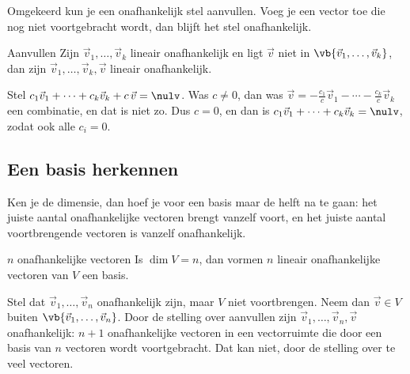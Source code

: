 \begin{oefeningen}
\end{oefeningen}

Omgekeerd kun je een onafhankelijk stel aanvullen. Voeg je een vector toe die nog niet voortgebracht wordt, dan blijft het stel onafhankelijk.

\begin{theorie}
\begin{stelling}{Aanvullen}
Zijn $\vec v_1, \ldots, \vec v_k$ lineair onafhankelijk en ligt $\vec v$ niet in $\vb{\vec v_1, \ldots, \vec v_k}$, dan zijn $\vec v_1, \ldots, \vec v_k, \vec v$ lineair onafhankelijk.
\end{stelling}

\begin{bewijs}
Stel $c_1\vec v_1 + \cdots + c_k\vec v_k + c\,\vec v = \nulv$. Was $c \neq 0$, dan was $\vec v = -\frac{c_1}{c}\vec v_1 - \cdots - \frac{c_k}{c}\vec v_k$ een combinatie, en dat is niet zo. Dus $c = 0$, en dan is $c_1\vec v_1 + \cdots + c_k\vec v_k = \nulv$, zodat ook alle $c_i = 0$.
\end{bewijs}
\end{theorie}

\subsection{Een basis herkennen}

Ken je de dimensie, dan hoef je voor een basis maar de helft na te gaan: het juiste aantal onafhankelijke vectoren brengt vanzelf voort, en het juiste aantal voortbrengende vectoren is vanzelf onafhankelijk.

\begin{theorie}
\begin{stelling}{$n$ onafhankelijke vectoren}
Is $\dim V = n$, dan vormen $n$ lineair onafhankelijke vectoren van $V$ een basis.
\end{stelling}

\begin{bewijs}
Stel dat $\vec v_1, \ldots, \vec v_n$ onafhankelijk zijn, maar $V$ niet voortbrengen. Neem dan $\vec v \in V$ buiten $\vb{\vec v_1, \ldots, \vec v_n}$. Door de stelling over aanvullen zijn $\vec v_1, \ldots, \vec v_n, \vec v$ onafhankelijk: $n + 1$ onafhankelijke vectoren in een vectorruimte die door een basis van $n$ vectoren wordt voortgebracht. Dat kan niet, door de stelling over te veel vectoren.
\end{bewijs}
\end{theorie}

